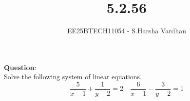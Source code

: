 \documentclass[journal]{IEEEtran}
\begin{document}


\title{5.2.56}
\author{EE25BTECH11054 - S.Harsha Vardhan}
\maketitle 
\renewcommand{\thefigure}{\theenumi}
\renewcommand{\thetable}{\theenumi}
\setlength{\intextsep}{10pt} %

\renewcommand{\thetable}{\theenumi}
\vspace{-1em}
\textbf{Question}:\\
	Solve the following system of linear equations.
	\[
	\frac{5}{x-1} + \frac{1}{y-2} = 2 \quad
	\frac{6}{x-1} - \frac{3}{y-2} = 1
	\]
	
\end{document}
